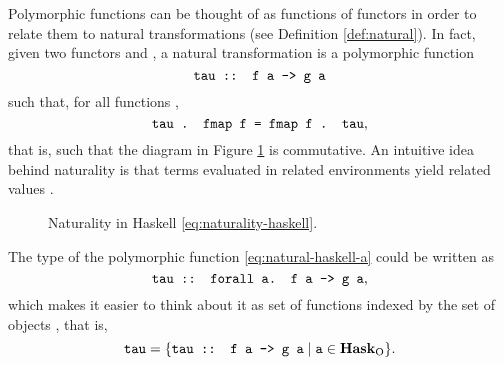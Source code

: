Polymorphic functions can be thought of as functions of functors in order
to relate them to natural transformations (see Definition \ref{def:natural}).
In fact, given two functors  and , a
natural transformation  is a polymorphic function
\begin{equation}
  \label{eq:natural-haskell-a}
  \text{\texttt{tau :: f a -> g a}}
\end{equation}
such that, for all functions ,
\begin{equation}
  \label{eq:naturality-haskell}
  \text{\texttt{tau . fmap f = fmap f . tau}}
  \text{,}
\end{equation}
that is, such that the diagram in Figure \ref{fig:naturality-haskell}
is commutative. An intuitive idea behind naturality is that terms
evaluated in related environments yield related values
\parencite[347--348]{wadler-1989}.
\begin{figure}[htbp]
  \begin{center}
  \end{center}
  \caption{Naturality in Haskell \eqref{eq:naturality-haskell}.}
  \label{fig:naturality-haskell}
\end{figure}

The type of the polymorphic function 
\eqref{eq:natural-haskell-a} could be written as
\begin{equation}
  \label{eq:natural-haskell-b}
  \text{\texttt{tau :: forall a. f a -> g a}}
  \text{,}
\end{equation}
which makes it easier to think about it as set of functions indexed
by the set of objects \catO{\hask}, that is,
\begin{equation*}
  \text{\texttt{tau}} =
  \{\text{\texttt{tau :: f a -> g a}} \mid \text{\texttt{a}}
  \in \mathcal{\mathbf{Hask}}_{\operatorname{O}}\}
  \text{.}
\end{equation*}

